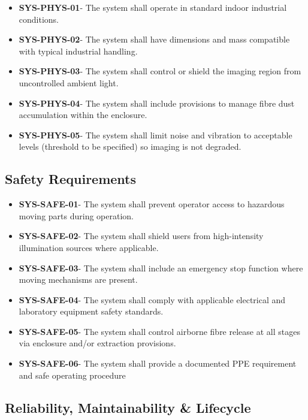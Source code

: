 \documentclass[a4paper, 12pt, english]{article}
\begin{document}
\begin{itemize}
    \item \textbf{SYS-PHYS-01}- The system shall operate in standard indoor industrial conditions.
    \item \textbf{SYS-PHYS-02}- The system shall have dimensions and mass compatible with typical industrial handling.
    \item \textbf{SYS-PHYS-03}- The system shall control or shield the imaging region from uncontrolled ambient light.
    \item \textbf{SYS-PHYS-04}- The system shall include provisions to manage fibre dust accumulation within the enclosure.
    \item \textbf{SYS-PHYS-05}- The system shall limit noise and vibration to acceptable levels (threshold to be specified) so imaging is not degraded.

\end{itemize}

\subsection{Safety Requirements}

\begin{itemize}
    \item \textbf{SYS-SAFE-01}- The system shall prevent operator access to hazardous moving parts during operation.
    \item \textbf{SYS-SAFE-02}- The system shall shield users from high-intensity illumination sources where applicable.
    \item \textbf{SYS-SAFE-03}- The system shall include an emergency stop function where moving mechanisms are present.
    \item \textbf{SYS-SAFE-04}- The system shall comply with applicable electrical and laboratory equipment safety standards.
    \item \textbf{SYS-SAFE-05}- The system shall control airborne fibre release at all stages via enclosure and/or extraction provisions.  
    \item \textbf{SYS-SAFE-06}- The system shall provide a documented PPE requirement and safe operating procedure 
\end{itemize}

\subsection{Reliability, Maintainability \& Lifecycle}
\end{document}
